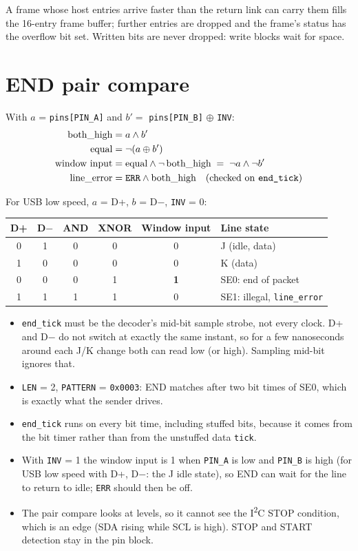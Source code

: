 \documentclass[11pt,a4paper]{article}
\newcommand{\sig}[1]{\texttt{#1}}
\begin{document}
A frame whose host entries arrive faster than the return link can carry them fills the 16-entry frame buffer; further entries are dropped and the frame's status has the overflow bit set. Written bits are never dropped: write blocks wait for space.

\section{END pair compare}\label{sec:pair}

With $a$ = \sig{pins[PIN\_A]} and $b' = $ \sig{pins[PIN\_B]} $\oplus$ \sig{INV}:
\begin{align*}
\text{both\_high} &= a \land b' \\
\text{equal} &= \lnot(a \oplus b') \\
\text{window input} &= \text{equal} \land \lnot\,\text{both\_high} \;=\; \lnot a \land \lnot b' \\
\text{line\_error} &= \sig{ERR} \land \text{both\_high} \quad\text{(checked on \sig{end\_tick})}
\end{align*}

For USB low speed, $a$ = D+, $b$ = D$-$, \sig{INV} = 0:

\begin{center}
\begin{tabular}{@{}cccccl@{}}
\toprule
D+ & D$-$ & AND & XNOR & Window input & Line state \\
\midrule
0 & 1 & 0 & 0 & 0 & J (idle, data) \\
1 & 0 & 0 & 0 & 0 & K (data) \\
0 & 0 & 0 & 1 & \textbf{1} & SE0: end of packet \\
1 & 1 & 1 & 1 & 0 & SE1: illegal, \sig{line\_error} \\
\bottomrule
\end{tabular}
\end{center}

\begin{itemize}
\item \sig{end\_tick} must be the decoder's mid-bit sample strobe, not every clock. D+ and D$-$ do not switch at exactly the same instant, so for a few nanoseconds around each J/K change both can read low (or high). Sampling mid-bit ignores that.
\item \sig{LEN} = 2, \sig{PATTERN} = \texttt{0x0003}: END matches after two bit times of SE0, which is exactly what the sender drives.
\item \sig{end\_tick} runs on every bit time, including stuffed bits, because it comes from the bit timer rather than from the unstuffed data \sig{tick}.
\item With \sig{INV} = 1 the window input is 1 when \sig{PIN\_A} is low and \sig{PIN\_B} is high (for USB low speed with D+, D$-$: the J idle state), so END can wait for the line to return to idle; \sig{ERR} should then be off.
\item The pair compare looks at levels, so it cannot see the I\textsuperscript{2}C STOP condition, which is an edge (SDA rising while SCL is high). STOP and START detection stay in the pin block.
\end{itemize}
\end{document}
